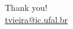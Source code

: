 \begin{frame}
\frametitle[alignment=center]{}
\flushbottom
\centering
Thank you!\\
\href{mailto:tiago@ic.ufal.br}{tvieira@ic.ufal.br}\\
\end{frame}
